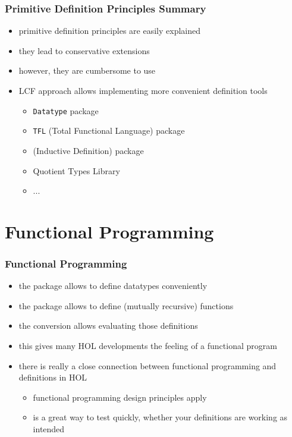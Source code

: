 \begin{frame}
\frametitle{Primitive Definition Principles Summary}
\begin{itemize}
\item primitive definition principles are easily explained
\item they lead to conservative extensions
\item however, they are cumbersome to use
\item LCF approach allows implementing more convenient definition tools
\begin{itemize}
\item \alert{\texttt{Datatype}} package
\item \alert{\texttt{TFL}} (Total Functional Language) package
\item {} (Inductive Definition) package
\item {} Quotient Types Library
\item ...
\end{itemize}
\end{itemize}
\end{frame}



\section{Functional Programming}

\begin{frame}
\frametitle{Functional Programming}
\begin{itemize}
\item the  package allows to define datatypes conveniently
\item the  package allows to define (mutually recursive) functions
\item the  conversion allows evaluating those definitions
\item this gives many HOL developments the feeling of a functional program
\item there is really a close connection between functional programming and definitions in HOL
\begin{itemize}
\item functional programming design principles apply
\item {} is a great way to test quickly, whether your definitions are working as intended
\end{itemize}
\end{itemize}
\end{frame}

